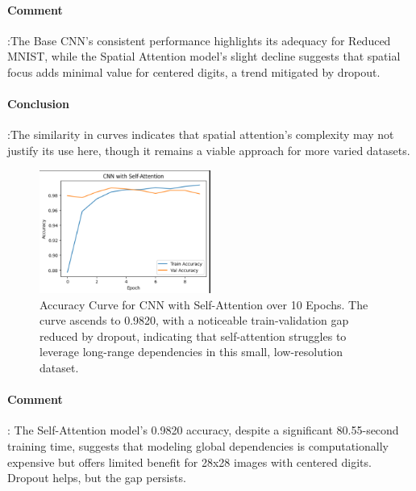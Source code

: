 \documentclass[12pt]{article}
\begin{document}
\paragraph{Comment}:The Base CNN's consistent performance highlights its adequacy for Reduced MNIST, while the Spatial Attention model's slight decline suggests that spatial focus adds minimal value for centered digits, a trend mitigated by dropout.
\paragraph{Conclusion}:The similarity in curves indicates that spatial attention's complexity may not justify its use here, though it remains a viable approach for more varied datasets.
\begin{figure}[H]
    \centering
    \includegraphics[width=0.5\textwidth]{accuracy_curve_self_attention.png}
    \caption{Accuracy Curve for CNN with Self-Attention over 10 Epochs. The curve ascends to 0.9820, with a noticeable train-validation gap reduced by dropout, indicating that self-attention struggles to leverage long-range dependencies in this small, low-resolution dataset.}
    \label{fig:accuracy_curve_self}
\end{figure}
\paragraph{Comment}: The Self-Attention model's 0.9820 accuracy, despite a significant 80.55-second training time, suggests that modeling global dependencies is computationally expensive but offers limited benefit for 28x28 images with centered digits. Dropout helps, but the gap persists.
\end{document}
